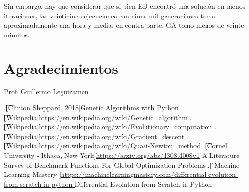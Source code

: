 \documentclass[10pt]{article}
\begin{document}
Sin embargo, hay que considerar que si bien ED encontró una solución en menos iteraciones, las veinticinco ejecuciones con cinco mil generaciones tomo aproximadamente una hora y media, en contra parte, GA tomo menos de veinte minutos.


\section*{Agradecimientos}
Prof. Guillermo Leguizamon


\begin{thebibliography}{99} %
.\t[Clinton Sheppard, 2018]{}Genetic Algorithms with Python
.\t[Wikipedia]{}\url{https://en.wikipedia.org/wiki/Genetic_algorithm}
.\t[Wikipedia]{}\url{https://en.wikipedia.org/wiki/Evolutionary_computation}
.\t[Wikipedia]{}\url{https://en.wikipedia.org/wiki/Gradient_descent}
.\t[Wikipedia]{}\url{https://en.wikipedia.org/wiki/Quasi-Newton_method}
.\t[Cornell University - Ithaca, New York]{}\url{https://arxiv.org/abs/1308.4008v1} A Literature Survey of Benchmark Functions For Global Optimization Problems
.\t[ Machine Learning Mastery ]{}\url{https://machinelearningmastery.com/differential-evolution-from-scratch-in-python } Differential Evolution from Scratch in Python


\end{thebibliography} 
\end{document}
